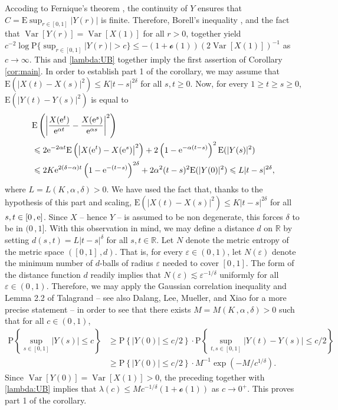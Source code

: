 \documentclass[reqno]{amsart}
\DeclareMathOperator{\Var}{Var}
\newcommand{\<}{\langle}
\renewcommand{\>}{\rangle}
\newcommand{\R}{\mathbb{R}}
\renewcommand{\P}{\mathrm{P}}
\newcommand{\E}{\mathrm{E}}
\newcommand{\1}{\mathbb{1}}
\newcommand{\e}{{\rm e}}
\renewcommand{\ge}{\geqslant}
\renewcommand{\le}{\leqslant}
\theoremstyle{definition}
\numberwithin{equation}{section}
\begin{document}
Accoding to Fernique's theorem \cite{Fernique}, the continuity of $Y$ ensures
that $C=\E\sup_{r\in[0,1]}|Y(r)|$ is finite. Therefore,
Borell's inequality \cite{Borell}, and the fact that $\Var[Y(r)]=\Var[X(1)]$
for all $r>0$, together yield
$c^{-2} \log \P\{\textstyle\sup_{r\in[0,1]}|Y(r)| > c\} \le 
-(1+\mathcal{o}(1))(2\Var[X(1)])^{-1}$ as $c\to\infty$.
This and \eqref{lambda:UB} together imply the first assertion of Corollary \ref{cor:main}.
In order to establish part 1 of the corollary, we may assume
that $\E(|X(t)-X(s)|^2)\le K|t-s|^{2\delta}$ for all $s,t\ge0$.
Now, for every $1\ge t\ge s\ge 0$, $\E(|Y(t)-Y(s)|^2)$ is equal to
\begin{align*}
	&\E\left(\left| \frac{X(\e^t)}{\e^{\alpha t}} - 
		\frac{X(\e^s)}{\e^{\alpha s}}\right|^2 \right)\\
		&\le 2\e^{-2\alpha t}\E\left(\left| X(\e^t)-X(\e^s)\right|^2\right)
		+2 \left( 1 - \e^{-\alpha (t-s)}\right)^2\E(|Y(s)|^2)\\
	&\le 2K\e^{2(\delta-\alpha) t}\left(1-\e^{-(t-s)}\right)^{2\delta}
		+2 \alpha^2(t-s)^2\E(|Y(0)|^2)
		\le L|t-s|^{2\delta},
\end{align*}
where $L=L(K\,,\alpha\,,\delta)>0$. We have used the fact that,
thanks to the hypothesis of this part and scaling,
$\E(|X(t)-X(s)|^2)\le K|t-s|^{2\delta}$ for all $s,t\in[0\,,\e]$.
Since $X$ -- hence $Y$ -- is assumed to be non degenerate, this forces $\delta$ to be
in $(0\,,1]$. With this observation in mind, we may define
a distance $d$ on $\R$ by setting
$d(s\,,t) = L|t-s|^\delta$ for all $s,t\in\R$.
Let $N$ denote the metric entropy of the metric space
$([0\,,1]\,,d)$. That is,
for every $\varepsilon\in(0\,,1)$, let $N(\varepsilon)$ denote the
minimum number of $d$-balls of radius $\varepsilon$ needed
to cover $[0\,,1]$. The form of the distance function $d$
readily implies that $N(\varepsilon) \lesssim \varepsilon^{-1/\delta}$
uniformly for all $\varepsilon\in(0\,,1)$. Therefore, we may apply the Gaussian correlation inequality \cite{Royen,LatalaMatlak} and Lemma 2.2 of
Talagrand \cite{T95} -- see also Dalang, Lee, Mueller, and Xiao \cite[Lemma 3.4]{DLMX21}
for a more precise statement -- in order to see that there exists $M=M(K\,,\alpha\,,\delta)>0$
such that for all $c \in (0\,,1)$,
\begin{align*}\textstyle
	\P\left\{ \sup_{s\in[0,1]}|Y(s)|\le c \right\}
	& \textstyle \ge \P\left\{ |Y(0)| \le c/2\right\} \cdot 
		\P\left\{ \sup_{t,s\in[0,1]}|Y(t)-Y(s)|\le c/2 \right\}\\
	& \ge \P\left\{ |Y(0)| \le c/2\right\} \cdot M^{-1}\exp(- M/c^{1/\delta}).
\end{align*}
Since $\Var[Y(0)] = \Var[X(1)] > 0$, the preceding together with \eqref{lambda:UB} implies that $\lambda(c) \le M c^{-1/\delta} (1+\mathcal{o}(1))$ as $c \to 0^+$. This proves part 1 of the corollary.
\end{document}
